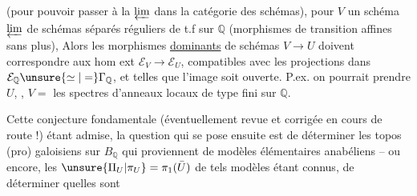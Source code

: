(pour pouvoir passer à la $\varprojlim$ dans la catégorie des schémas), pour $V$ un schéma $\varprojlim$ de schémas séparés réguliers de t.f sur $\mathbb{Q}$ (morphismes de transition  affines sans plus), Alors les morphismes \uline{dominants} de schémas $V\longrightarrow U$ doivent correspondre aux hom ext $\mathcal{E}_V\longrightarrow\mathcal{E}_U$, compatibles avec les projections dans $\mathcal{E}_{\mathbb{Q}}\unsure{\simeq|=}\Gamma_{\mathbb{Q}}$, et telles que l'image soit ouverte. P.ex. on pourrait prendre  $U$, , $V=$ les spectres d'anneaux locaux  de type fini sur $\mathbb{Q}$.


Cette conjecture fondamentale (éventuellement revue et corrigée en cours de route !) étant admise, la question qui se pose ensuite est de déterminer les topos (pro) galoisiens sur $B_{\mathbb{Q}}$ qui proviennent de modèles élémentaires anabéliens -- ou encore, les $\unsure{\Pi_U|\pi_U}=\pi_1(\bar U)$ de tels modèles étant connus, de déterminer quelles sont
